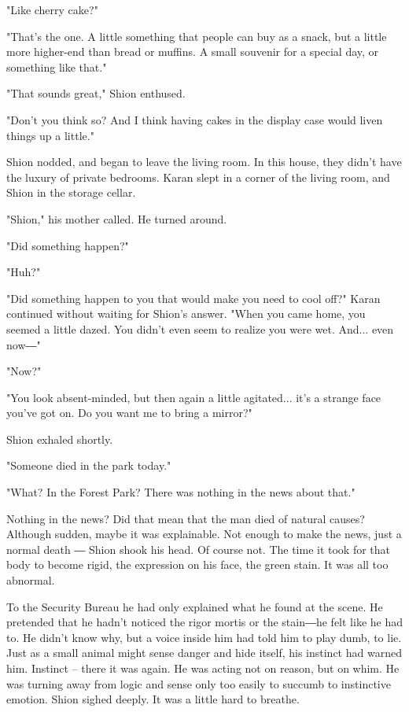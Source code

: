 "Like cherry cake?"

"That's the one. A little something that people can buy as a snack, but
a little more higher-end than bread or muffins. A small souvenir for a
special day, or something like that."

"That sounds great," Shion enthused.

"Don't you think so? And I think having cakes in the display case would
liven things up a little."

Shion nodded, and began to leave the living room. In this house, they
didn't have the luxury of private bedrooms. Karan slept in a corner of
the living room, and Shion in the storage cellar.

"Shion," his mother called. He turned around.

"Did something happen?"

"Huh?"

"Did something happen to you that would make you need to cool off?"
Karan continued without waiting for Shion's answer. "When you came home,
you seemed a little dazed. You didn't even seem to realize you were wet.
And... even now―"

"Now?"

"You look absent-minded, but then again a little agitated... it's a
strange face you've got on. Do you want me to bring a mirror?"

Shion exhaled shortly.

"Someone died in the park today."

"What? In the Forest Park? There was nothing in the news about that."

Nothing in the news? Did that mean that the man died of natural causes?
Although sudden, maybe it was explainable. Not enough to make the news,
just a normal death ― Shion shook his head. Of course not. The time it
took for that body to become rigid, the expression on his face, the
green stain. It was all too abnormal.

To the Security Bureau he had only explained what he found at the scene.
He pretended that he hadn't noticed the rigor mortis or the stain―he
felt like he had to. He didn't know why, but a voice inside him had told
him to play dumb, to lie. Just as a small animal might sense danger and
hide itself, his instinct had warned him. Instinct -- there it was again.
He was acting not on reason, but on whim. He was turning away from logic
and sense only too easily to succumb to instinctive emotion. Shion
sighed deeply. It was a little hard to breathe.


